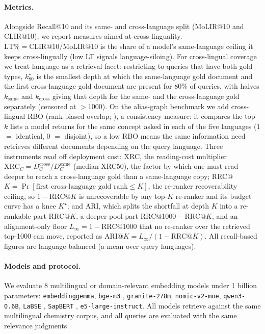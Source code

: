 \paragraph{Metrics.}
Alongside Recall@10 and its same- and cross-language split (MoLIR@10 and CLIR@10),
we report measures aimed at cross-linguality. $\mathrm{LT}\%=
\mathrm{CLIR@10}/\mathrm{MoLIR@10}$ is the share of a model's same-language ceiling
it keeps cross-lingually (low LT signals language-siloing). For cross-lingual
coverage we treat language as a retrieval facet: restricting to queries that have
both gold types, $k^\star_{80}$ is the smallest depth at which the same-language
gold document and the first cross-language gold document are present for $80\%$ of
queries, with halves $k_{\mathrm{same}}$ and $k_{\mathrm{cross}}$ giving that depth
for the same- and the cross-language gold separately (censored at $>$1000). On the
alias-graph benchmark we add cross-lingual RBO (rank-biased overlap;
\citealp{rbo2010}), a consistency measure: it compares the top-$k$ lists a model
returns for the same concept asked in each of the five languages ($1$ $=$ identical,
$0$ $=$ disjoint), so a low RBO means the same information need retrieves different
documents depending on the query language. Three instruments read off deployment
cost: XRC, the reading-cost multiplier
$\mathrm{XRC}_C=D^{\text{cross}}_C/D^{\text{same}}_C$ (median XRC50), the factor by
which one must read deeper to reach a cross-language gold than a same-language copy;
RRC@$K=\Pr[\text{first cross-language gold rank}\le K]$, the re-ranker recoverability
ceiling, so $1-\mathrm{RRC@}K$ is unrecoverable by any top-$K$ re-ranker and its
budget curve has a knee $K^\star$; and ARI, which splits the shortfall at depth $K$
into a re-rankable part $\mathrm{RRC@}K$, a deeper-pool part
$\mathrm{RRC@1000}-\mathrm{RRC@}K$, and an alignment-only floor
$L_\infty=1-\mathrm{RRC@1000}$ that no re-ranker over the retrieved top-1000 can move,
reported as $\mathrm{ARI@}K=L_\infty/(1-\mathrm{RRC@}K)$. All recall-based figures are
language-balanced (a mean over query languages).



\paragraph{Models and protocol.}
We evaluate 8 multilingual or domain-relevant embedding models under 1 billion parameters:
\texttt{embeddinggemma}, \texttt{bge-m3} \citep{bgem3_2024},
\texttt{granite-278m}, \texttt{nomic-v2-moe}, \texttt{qwen3-0.6B},
\texttt{LaBSE} \citep{labse2022}, \texttt{SapBERT} \citep{sapbert2021},
\texttt{e5-large-instruct}. All models retrieve against
the same multilingual chemistry corpus, and all queries are evaluated with the
same relevance judgments. 

